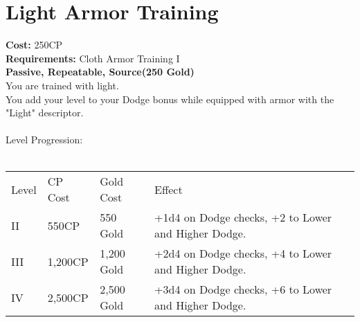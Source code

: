 \section{Light Armor Training}\label{perk:lightArmorTraining}
\textbf{Cost:} 250CP\\
\textbf{Requirements:} Cloth Armor Training I\\
\textbf{Passive, Repeatable, Source(250 Gold)}\\
You are trained with light.\\
You add your level to your Dodge bonus while equipped with armor with the "Light" descriptor.\\
\\

Level Progression:\\
\\
\begin{tabular}{l | l | l | l}
	Level & CP Cost & Gold Cost & Effect\\
	II & 550CP & 550 Gold & +1d4 on Dodge checks, +2 to Lower and Higher Dodge.\\
	III & 1,200CP & 1,200 Gold & +2d4 on Dodge checks, +4 to Lower and Higher Dodge.\\
	IV & 2,500CP & 2,500 Gold & +3d4 on Dodge checks, +6 to Lower and Higher Dodge.\\
\end{tabular}
